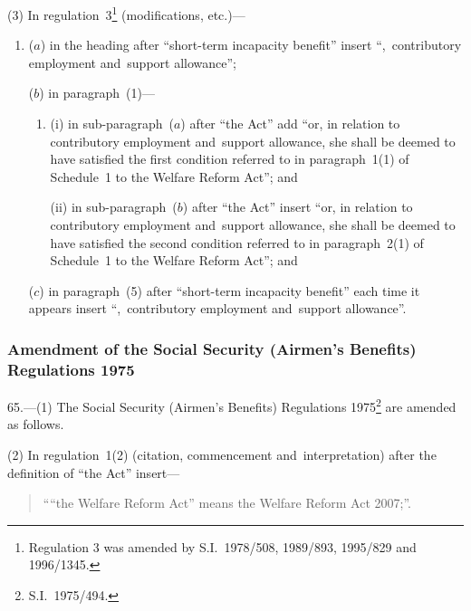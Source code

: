 \documentclass[12pt,a4paper]{article}
\begin{document}
(3) In regulation~3\footnote{Regulation 3 was amended by S.I.~1978/508, 1989/893, 1995/829 and 1996/1345.} (modifications, etc.)—
\begin{enumerate}\item[]
($a$) in the heading after “short-term incapacity benefit” insert “,~contributory employment and~support allowance”;

($b$) in paragraph~(1)—
\begin{enumerate}\item[]
(i) in sub-paragraph~($a$)  after “the Act” add “or, in relation to contributory employment and~support allowance, she shall be deemed to have satisfied the first condition referred to in paragraph~1(1) of Schedule~1 to the Welfare Reform Act”; and

(ii) in sub-paragraph~($b$)  after “the Act” insert “or, in relation to contributory employment and~support allowance, she shall be deemed to have satisfied the second condition referred to in paragraph~2(1) of Schedule~1 to the Welfare Reform Act”; and
\end{enumerate}

($c$) in paragraph~(5) after “short-term incapacity benefit” each time it appears insert “,~contributory employment and~support allowance”.
\end{enumerate}

\subsubsection[65. Amendment of the Social Security (Airmen’s Benefits) Regulations 1975]{Amendment of the Social Security (Airmen’s Benefits) Regulations 1975}

65.---(1)  The Social Security (Airmen’s Benefits) Regulations 1975\footnote{S.I.~1975/494.} are amended as follows.

(2) In regulation~1(2) (citation, commencement and~interpretation) after the definition of “the Act” insert—
\begin{quotation}
““the Welfare Reform Act” means the Welfare Reform Act 2007;”.
\end{quotation}
\end{document}
